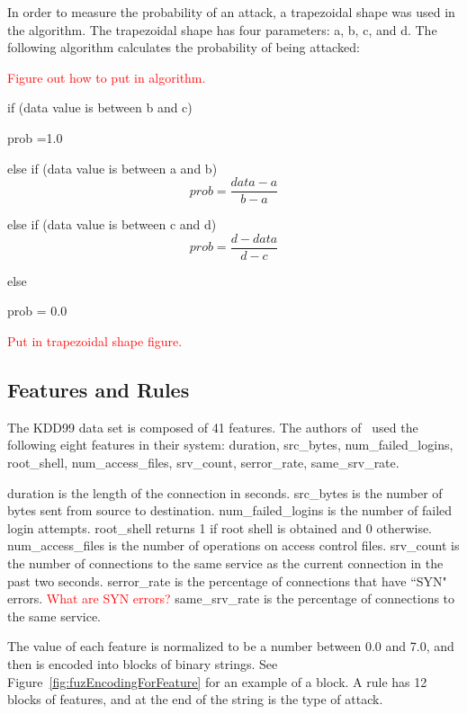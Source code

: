 \documentclass{sig-alternate}
\newcommand{\mycomment}[1]{\textcolor{red}{#1}}
\begin{document}
In order to measure the probability of an attack, a trapezoidal shape was used in the algorithm. The trapezoidal shape has four parameters: a, b, c, and d. The following algorithm calculates the probability of being attacked:

\mycomment{Figure out how to put in algorithm.}

if (data value is between b and c)

   prob =1.0
   
else if (data value is between a and b)
\begin{equation*}
   prob = \frac{data - a}{b-a}
\end{equation*}

else if (data value is between c and d)
\begin{equation*}
   prob = \frac{d-data}{d-c}
\end{equation*}

else

   prob = 0.0




\mycomment{Put in trapezoidal shape figure.}




\subsection{Features and Rules}
The KDD99 data set is composed of 41 features. The authors of~\cite{6496342, 6559603} used the following eight features in their system: duration, src\_bytes, num\_failed\_logins, root\_shell, num\_access\_files, srv\_count, serror\_rate, same\_srv\_rate.

duration is the length of the connection in seconds. src\_bytes is the number of bytes sent from source to destination. num\_failed\_logins is the number of failed login attempts. root\_shell returns 1 if root shell is obtained and 0 otherwise. num\_access\_files is the number of operations on access control files. srv\_count is the number of connections to the same service as the current connection in the past two seconds. serror\_rate is the percentage of connections that have ``SYN" errors.
\mycomment{What are SYN errors?}
 same\_srv\_rate is the percentage of connections to the same service.~\cite{KDD99Features}


The value of each feature is normalized to be a number between 0.0 and 7.0, and then is encoded into blocks of binary strings. See Figure~\ref{fig:fuzEncodingForFeature} for an example of a block. A rule has 12 blocks of features, and at the end of the string is the type of attack. 
\end{document}
